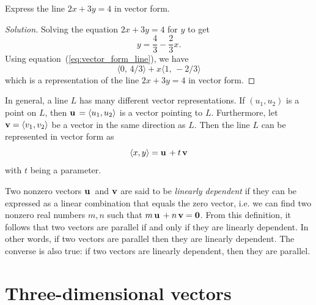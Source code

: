 \begin{example}
Express the line $2x + 3y = 4$ in vector form.
\end{example}

\begin{proof}[Solution]
Solving the equation $2x + 3y = 4$ for $y$ to get
\[
y = \frac{4}{3} - \frac{2}{3} x.
\]
Using equation~(\ref{eq:vector_form_line}), we have
\[
\langle 0,\, 4/3 \rangle
+ x \langle 1,\, -2/3 \rangle
\]
which is a representation of the line $2x + 3y = 4$ in vector form.
\end{proof}

In general, a line $L$ has many different vector representations. If
$(u_1, u_2)$ is a point on $L$, then $\operatorname*{\mathbf{u}}{} = \langle u_1, u_2
\rangle$ is a vector pointing to $L$. Furthermore, let $\operatorname*{\mathbf{v}} =
\langle v_1, v_2 \rangle$ be a vector in the same direction as
$L$. Then the line $L$ can be represented in vector form as
\[
\langle x, y \rangle
=
\operatorname*{\mathbf{u}}{} + t \operatorname*{\mathbf{v}}
\]
with $t$ being a parameter.

Two nonzero vectors $\operatorname*{\mathbf{u}}{}$ and $\operatorname*{\mathbf{v}}$ are said to be
\emph{linearly dependent} if they can be
expressed as a linear combination that equals the zero vector, i.e. we
can find two nonzero real numbers $m,n$ such that
$m\operatorname*{\mathbf{u}}{} + n\operatorname*{\mathbf{v}} = \operatorname*{\textbf{0}}$. From this definition, it follows that
two vectors are parallel if and only if they
are linearly dependent. In other words, if two vectors are parallel
then they are linearly dependent. The converse is also true: if two
vectors are linearly dependent, then they are parallel.



\section{Three-dimensional vectors}

